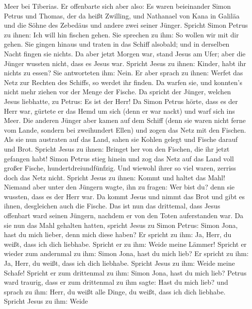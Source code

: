 Meer bei Tiberias. Er offenbarte sich aber also:  Es waren
beieinander Simon Petrus und Thomas, der da heißt Zwilling, und
Nathanael von Kana in Galiläa und die Söhne des Zebedäus und andere zwei
seiner Jünger.  Spricht Simon Petrus zu ihnen: Ich will hin
fischen gehen. Sie sprechen zu ihm: So wollen wir mit dir gehen. Sie
gingen hinaus und traten in das Schiff alsobald; und in derselben Nacht
fingen sie nichts.  Da aber jetzt Morgen war, stand Jesus am
Ufer; aber die Jünger wussten nicht, dass es Jesus war. 
Spricht Jesus zu ihnen: Kinder, habt ihr nichts zu essen? Sie
antworteten ihm: Nein.  Er aber sprach zu ihnen: Werfet das
Netz zur Rechten des Schiffs, so werdet ihr finden. Da warfen sie, und
konnten's nicht mehr ziehen vor der Menge der Fische.  Da
spricht der Jünger, welchen Jesus liebhatte, zu Petrus: Es ist der Herr!
Da Simon Petrus hörte, dass es der Herr war, gürtete er das Hemd um sich
(denn er war nackt) und warf sich ins Meer.  Die anderen
Jünger aber kamen auf dem Schiff (denn sie waren nicht ferne vom Lande,
sondern bei zweihundert Ellen) und zogen das Netz mit den Fischen.
 Als sie nun austraten auf das Land, sahen sie Kohlen gelegt
und Fische darauf und Brot.  Spricht Jesus zu ihnen:
Bringet her von den Fischen, die ihr jetzt gefangen habt! 
Simon Petrus stieg hinein und zog das Netz auf das Land voll großer
Fische, hundertdreiundfünfzig. Und wiewohl ihrer so viel waren, zerriss
doch das Netz nicht.  Spricht Jesus zu ihnen: Kommt und
haltet das Mahl! Niemand aber unter den Jüngern wagte, ihn zu fragen:
Wer bist du? denn sie wussten, dass es der Herr war.  Da
kommt Jesus und nimmt das Brot und gibt es ihnen, desgleichen auch die
Fische.  Das ist nun das drittemal, dass Jesus offenbart
ward seinen Jüngern, nachdem er von den Toten auferstanden war.
 Da sie nun das Mahl gehalten hatten, spricht Jesus zu
Simon Petrus: Simon Jona, hast du mich lieber, denn mich diese haben? Er
spricht zu ihm: Ja, Herr, du weißt, dass ich dich liebhabe. Spricht er
zu ihm: Weide meine Lämmer!  Spricht er wieder zum
andernmal zu ihm: Simon Jona, hast du mich lieb? Er spricht zu ihm: Ja,
Herr, du weißt, dass ich dich liebhabe. Spricht Jesus zu ihm: Weide
meine Schafe!  Spricht er zum drittenmal zu ihm: Simon
Jona, hast du mich lieb? Petrus ward traurig, dass er zum drittenmal zu
ihm sagte: Hast du mich lieb? und sprach zu ihm: Herr, du weißt alle
Dinge, du weißt, dass ich dich liebhabe. Spricht Jesus zu ihm: Weide
